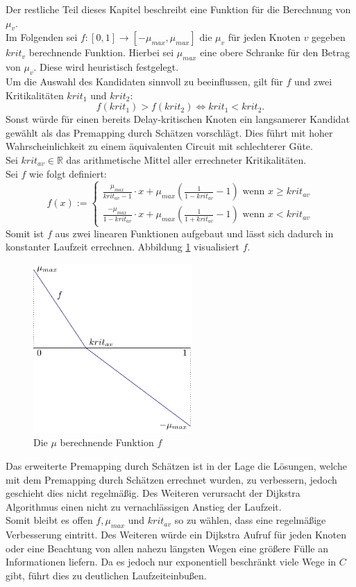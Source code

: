 \documentclass[11pt, a4paper, german]{article}
\begin{document}
Der restliche Teil dieses Kapitel beschreibt eine Funktion für die Berechnung von $\mu_v$.\\
Im Folgenden sei $f: [0,1] \rightarrow[-\mu_{max}, \mu_{max}]$ die $\mu_v$ für jeden Knoten $v$ gegeben $krit_v$ berechnende Funktion. Hierbei sei  $\mu_{max}$ eine obere Schranke für den Betrag von $\mu_v$. Diese wird heuristisch festgelegt. \\
Um die Auswahl des Kandidaten sinnvoll zu beeinflussen, gilt für $f$ und zwei Kritikalitäten $krit_1$ und $krit_2$:
\[f(krit_1) > f(krit_2) \Leftrightarrow krit_1 < krit_2.\]
Sonst würde für einen bereits Delay-kritischen Knoten ein langsamerer Kandidat gewählt als das Premapping durch Schätzen vorschlägt. Dies führt mit hoher Wahrscheinlichkeit zu einem äquivalenten Circuit mit schlechterer Güte.\\
Sei $krit_{av} \in \mathbb{R}$ das arithmetische Mittel aller errechneter Kritikalitäten. \\

Sei $f$ wie folgt definiert:
\[f(x) := \begin{cases} \frac{\mu_{max}}{krit_{av}-1}\cdot x + \mu_{max}(\frac{1}{1-krit_{av}}-1) \text{ wenn } x \geq krit_{av}
 \\ \frac{-\mu_{max}}{1-krit_{av}}\cdot x + \mu_{max}(\frac{1}{1+krit_{av}}-1)  \text{ wenn }x < krit_{av}\end{cases}\]
Somit ist $f$ aus zwei linearen Funktionen aufgebaut und lässt sich dadurch in konstanter Laufzeit errechnen. Abbildung \ref{bild:erw_prem} visualisiert $f$.\\
\begin{figure}
		\includegraphics[width = 6cm]{pictures/compiled/erw_prem}
		\caption{Die $\mu$ berechnende Funktion $f$}
		\label{bild:erw_prem}
\end{figure}
Das erweiterte Premapping durch Schätzen ist in der Lage die Lösungen, welche mit dem Premapping durch Schätzen errechnet wurden, zu verbessern, jedoch geschieht dies nicht regelmäßig. Des Weiteren verursacht der Dijkstra Algorithmus einen nicht zu vernachlässigen Anstieg der Laufzeit. \\
Somit bleibt es offen $f, \mu_{max}$ und $krit_{av}$ so zu wählen, dass eine regelmäßige Verbesserung eintritt. Des Weiteren würde ein Dijkstra Aufruf für jeden Knoten oder eine Beachtung von allen nahezu längsten Wegen eine größere Fülle an Informationen liefern. Da es jedoch nur exponentiell beschränkt viele Wege in $C$ gibt, führt dies zu deutlichen Laufzeiteinbußen. \\
\end{document}
